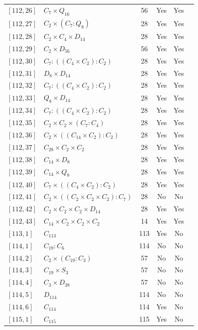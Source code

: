 \documentclass[12pt, a4paper]{article}
\theoremstyle{plain}
\theoremstyle{definition}
\begin{document}
\begin{longtable}{llcccl}
  $[112,26]$ & $C_7 \times Q_{16}$ & 56 & Yes & Yes \\
  $[112,27]$ & $C_2 \times (C_7 : Q_8)$ & 28 & Yes & Yes \\
  $[112,28]$ & $C_2 \times C_4 \times D_{14}$ & 28 & Yes & Yes \\
  $[112,29]$ & $C_2 \times D_{56}$ & 56 & Yes & Yes \\
  $[112,30]$ & $C_7 : ((C_4 \times C_2) : C_2)$ & 28 & Yes & Yes \\
  $[112,31]$ & $D_8 \times D_{14}$ & 28 & Yes & Yes \\
  $[112,32]$ & $C_7 : ((C_4 \times C_2) : C_2)$ & 28 & Yes & Yes \\
  $[112,33]$ & $Q_8 \times D_{14}$ & 28 & Yes & Yes \\
  $[112,34]$ & $C_7 : ((C_4 \times C_2) : C_2)$ & 28 & Yes & Yes \\
  $[112,35]$ & $C_2 \times C_2 \times (C_7 : C_4)$ & 28 & Yes & Yes \\
  $[112,36]$ & $C_2 \times ((C_{14} \times C_2) : C_2)$ & 28 & Yes & Yes \\
  $[112,37]$ & $C_{28} \times C_2 \times C_2$ & 28 & Yes & Yes \\
  $[112,38]$ & $C_{14} \times D_8$ & 28 & Yes & Yes \\
  $[112,39]$ & $C_{14} \times Q_8$ & 28 & Yes & Yes \\
  $[112,40]$ & $C_7 \times ((C_4 \times C_2) : C_2)$ & 28 & Yes & Yes \\
  $[112,41]$ & $C_2 \times ((C_2 \times C_2 \times C_2) : C_7)$ & 28 & No & No \\
  $[112,42]$ & $C_2 \times C_2 \times C_2 \times D_{14}$ & 28 & Yes & Yes \\
  $[112,43]$ & $C_{14} \times C_2 \times C_2 \times C_2$ & 14 & Yes & Yes \\
  $[113,1]$ & $C_{113}$ & 113 & Yes & No \\
  $[114,1]$ & $C_{19} : C_6$ & 114 & No & No \\
  $[114,2]$ & $C_2 \times (C_{19} : C_3)$ & 57 & No & No \\
  $[114,3]$ & $C_{19} \times S_3$ & 57 & No & No \\
  $[114,4]$ & $C_3 \times D_{38}$ & 57 & No & No \\
  $[114,5]$ & $D_{114}$ & 114 & No & No \\
  $[114,6]$ & $C_{114}$ & 114 & Yes & No \\
  $[115,1]$ & $C_{115}$ & 115 & Yes & No \\

\end{longtable}
\end{document}
